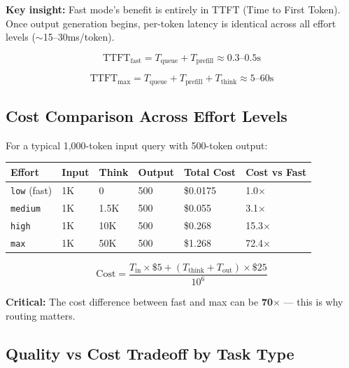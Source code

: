 \documentclass[11pt,a4paper]{article}
\begin{document}
\textbf{Key insight:} Fast mode's benefit is entirely in TTFT (Time to First Token). Once output generation begins, per-token latency is identical across all effort levels ($\sim$15--30ms/token).

$$\text{TTFT}_{\text{fast}} = T_{\text{queue}} + T_{\text{prefill}} \approx 0.3\text{--}0.5\text{s}$$

$$\text{TTFT}_{\text{max}} = T_{\text{queue}} + T_{\text{prefill}} + T_{\text{think}} \approx 5\text{--}60\text{s}$$

\subsection{Cost Comparison Across Effort Levels}

For a typical 1,000-token input query with 500-token output:

\begin{center}
\begin{tabular}{llllll}
\toprule
\textbf{Effort} & \textbf{Input} & \textbf{Think} & \textbf{Output} & \textbf{Total Cost} & \textbf{Cost vs Fast} \\
\midrule
\texttt{low} (fast) & 1K & 0 & 500 & \$0.0175 & 1.0$\times$ \\
\texttt{medium} & 1K & 1.5K & 500 & \$0.055 & 3.1$\times$ \\
\texttt{high} & 1K & 10K & 500 & \$0.268 & 15.3$\times$ \\
\texttt{max} & 1K & 50K & 500 & \$1.268 & 72.4$\times$ \\
\bottomrule
\end{tabular}
\end{center}

$$\text{Cost} = \frac{T_{\text{in}} \times \$5 + (T_{\text{think}} + T_{\text{out}}) \times \$25}{10^6}$$

\textbf{Critical:} The cost difference between fast and max can be \textbf{70$\times$} --- this is why routing matters.

\subsection{Quality vs Cost Tradeoff by Task Type}
\end{document}
